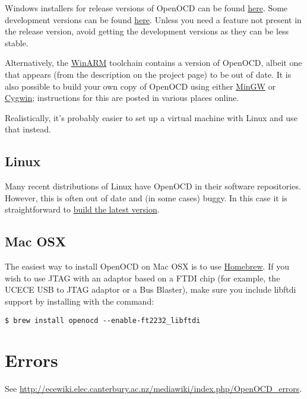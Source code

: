 Windows installers for release versions of OpenOCD can be found
\href{http://www.freddiechopin.info/index.php/en/download/category/4-openocd}{here}.
Some development versions can be found
\href{http://www.freddiechopin.info/index.php/en/download/category/10-openocd-dev}{here}.
Unless you need a feature not present in the release version, avoid
getting the development versions as they can be less stable.

Alternatively, the
\href{http://www.siwawi.arubi.uni-kl.de/avr_projects/arm_projects/}{WinARM}
toolchain contains a version of OpenOCD, albeit one that appears (from
the description on the project page) to be out of date. It is also
possible to build your own copy of OpenOCD using either
\href{http://www.mingw.org/}{MinGW} or
\href{http://www.cygwin.com/}{Cygwin}; instructions for this are posted
in various places online.

Realistically, it's probably easier to set up a virtual machine with
Linux and use that instead.

\subsection{Linux}
\label{linux}

Many recent distributions of Linux have OpenOCD in their software
repositories. However, this is often out of date and (in some cases)
buggy. In this case it is straightforward to
\href{Building_OpenOCD_under_Linux}{build the latest version}.

\subsection{Mac OSX}
\label{mac-osx}

The easiest way to install OpenOCD on Mac OSX is to use
\href{http://brew.sh/}{Homebrew}. If you wish to use JTAG with an
adaptor based on a FTDI chip (for example, the UCECE USB to JTAG
adaptor or a Bus Blaster), make sure you include libftdi support by
installing with the command:
%
\begin{verbatim}
$ brew install openocd --enable-ft2232_libftdi
\end{verbatim}

\section{Errors}
\label{errors}

See \url{http://ecewiki.elec.canterbury.ac.nz/mediawiki/index.php/OpenOCD_errors}.
